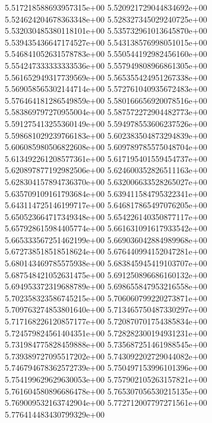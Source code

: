 5.517218588693957315e+00	5.520921729044834692e+00	5.524624204678363348e+00	5.528327345029240725e+00	5.532030485380118101e+00	5.535732961013645870e+00	5.539435436647174527e+00	5.543138576998051015e+00	5.546841052631578783e+00	5.550544192982456160e+00	5.554247333333333536e+00	5.557949808966861305e+00	5.561652949317739569e+00	5.565355424951267338e+00	5.569058565302144714e+00	5.572761040935672483e+00	5.576464181286549859e+00	5.580166656920078516e+00	5.583869797270955004e+00	5.587572272904482773e+00	5.591275413255360149e+00	5.594978553606237526e+00	5.598681029239766183e+00	5.602383504873294839e+00	5.606085980506822608e+00	5.609789785575048704e+00	5.613492261208577361e+00	5.617195401559454737e+00	5.620897877192982506e+00	5.624600352826511163e+00	5.628304157894736370e+00	5.632006633528265027e+00	5.635709109161793684e+00	5.639411584795322341e+00	5.643114725146199717e+00	5.646817865497076205e+00	5.650523664717349348e+00	5.654226140350877117e+00	5.657928615984405774e+00	5.661631091617933542e+00	5.665333567251462199e+00	5.669036042884989968e+00	5.672738518518518624e+00	5.676440994152047281e+00	5.680143469785575938e+00	5.683845945419103707e+00	5.687548421052631475e+00	5.691250896686160132e+00	5.694953372319688789e+00	5.698655847953216558e+00	5.702358323586745215e+00	5.706060799220273871e+00	5.709763274853801640e+00	5.713465750487330297e+00	5.717168226120857177e+00	5.720870701754385834e+00	5.724579824561404351e+00	5.728282300194931231e+00	5.731984775828459888e+00	5.735687251461988545e+00	5.739389727095517202e+00	5.743092202729044082e+00	5.746794678362572739e+00	5.750497153996101396e+00	5.754199629629630053e+00	5.757902105263157821e+00	5.761604580896686478e+00	5.765307056530215135e+00	5.769009532163742904e+00	5.772712007797271561e+00	5.776414483430799329e+00
